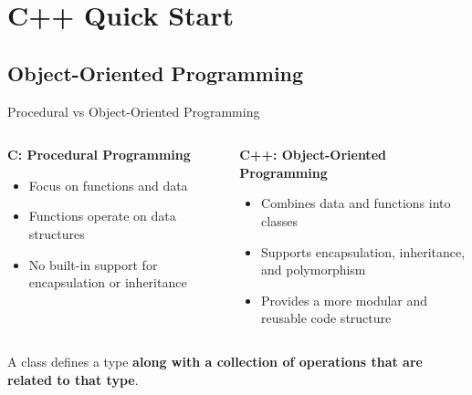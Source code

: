 \section{C++ Quick Start}

\subsection{Object-Oriented Programming}

\begin{frame}[fragile]{Procedural vs Object-Oriented Programming}
	\begin{columns}
		\begin{column}{0.5\textwidth}
			\textbf{C: Procedural Programming}
			\begin{itemize}
				\item Focus on functions and data
				\item Functions operate on data structures
				\item No built-in support for encapsulation or inheritance
			\end{itemize}
		\end{column}
		\begin{column}{0.5\textwidth}
			\textbf{C++: Object-Oriented Programming}
			\begin{itemize}
				\item Combines data and functions into classes
				\item Supports encapsulation, inheritance, and polymorphism
				\item Provides a more modular and reusable code structure
			\end{itemize}
		\end{column}
	\end{columns}

	A class defines a type \textbf{along with a collection of operations that are related to that type}.
\end{frame}

